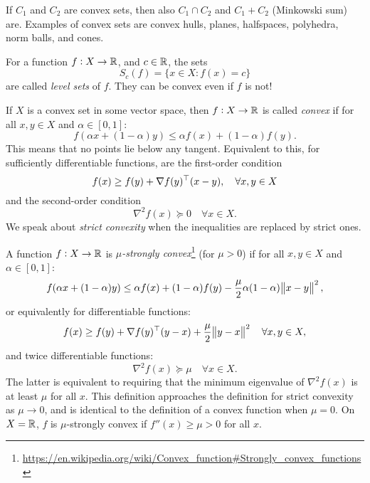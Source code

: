 \documentclass{article}
\begin{document}
If \(C_1\) and \(C_2\) are convex sets, then also \(C_1 \cap C_2\) and \(C_1 + C_2\) (Minkowski sum)
are.  Examples of convex sets are convex hulls, planes, halfspaces, polyhedra, norm balls, and
cones. 


For a function \(f: X \to \mathbb{R}\), and \(c \in \mathbb{R}\), the sets
\begin{equation*}
  S_c(f) = \{x \in X: f(x) = c\}
\end{equation*}
are called \emph{level sets} of \(f\). They can be convex even if \(f\) is not!

\label{s:convex_functions}

If \(X\) is a convex set in some vector space, then \(f: X \to \mathbb{R}\) is called \emph{convex} if for
all \(x, y \in X\) and \(\alpha \in [0,1]\):
\begin{equation*}
  f(\alpha x + (1 - \alpha) y) \leq \alpha f(x) + (1 - \alpha) f(y).
\end{equation*}
This means that no points lie below any tangent.  Equivalent to this, for sufficiently
differentiable functions, are the first-order condition
\begin{equation*}
  f(x) \geq f(y) + \nabla f(y)^{\top}(x - y), \quad \forall x, y \in X
\end{equation*}
and the second-order condition
\begin{equation*}
  \nabla^2 f(x) \succeq 0 \quad \forall x \in X.
\end{equation*}
We speak about \emph{strict convexity} when the inequalities are replaced by strict ones.

\label{s:strong_convexity}

A function \(f: X \to \mathbb{R}\) is \emph{\(\mu\)-strongly
  convex}\footnote{\url{https://en.wikipedia.org/wiki/Convex_function\#Strongly_convex_functions}}
(for \(\mu > 0\)) if for all \(x, y \in X\) and \(\alpha \in [0,1]\):
\begin{equation*}
  f(\alpha x + (1 - \alpha) y) \leq \alpha f(x) + (1 - \alpha) f(y)
  - \frac{\mu}{2} \alpha (1 - \alpha) \enVert[1]{x - y}^2,
\end{equation*}
or equivalently for differentiable functions:
\begin{equation*}
  f(x) \geq f(y) + \T{\nabla f(y)}(y - x) + \frac{\mu}{2}\enVert[1]{y - x}^2
  \quad \forall x, y \in X,
\end{equation*}
and twice differentiable functions:
\begin{equation*}
  \nabla^2 f(x) \succeq \mu \quad \forall x \in X.
\end{equation*}
The latter is equivalent to requiring that the minimum eigenvalue of \(\nabla^2 f(x)\) is at least
\(\mu\) for all \(x\).  This definition approaches the definition for strict convexity as
\(\mu \to 0\), and is identical to the definition of a convex function when \(\mu = 0\).  On
\(X = \mathbb{R}\), \(f\) is \(\mu\)-strongly convex if \(f''(x) \geq \mu > 0\) for all \(x\).
\end{document}
